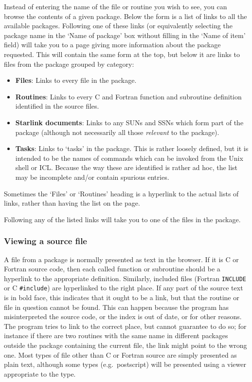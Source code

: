 \documentclass[twoside,11pt]{article}
\renewcommand{\_}{\texttt{\symbol{95}}}
\begin{document}
Instead of entering the name of the file or routine you wish to
see, you can browse the contents of a given package.
Below the form is a list of links to all the available packages.
Following one of these links (or equivalently selecting the package
name in the `Name of package' box without filling in the `Name of item'
field) will take you to a page giving more information about the 
package requested.
This will contain the same form at the top, 
but below it are links to files from the package grouped by category:
\begin{itemize}
\item {\bf Files}:
Links to every file in the package.
\item {\bf Routines}:
Links to every C and Fortran function and subroutine definition 
identified in the source files.
\item {\bf Starlink documents}:
Links to any SUNs and SSNs which form part of the package
(although not necessarily all those {\it relevant\/} to the package).
\item {\bf Tasks}:
Links to `tasks' in the package.
This is rather loosely defined, but it is intended to be
the names of commands which can be invoked from the Unix shell or ICL.
Because the way these are identified is rather ad hoc,
the list may be incomplete and/or contain spurious entries.
\end{itemize}
Sometimes the `Files' or `Routines' heading is a hyperlink to 
the actual lists of links, rather than having the list on the page.

Following any of the listed links 
will take you to one of the files in the package.

\subsubsection{Viewing a source file}

A file from a package is normally presented as text in the browser.
If it is C or Fortran source code, then each called function or
subroutine should be a hyperlink to the appropriate definition.
Similarly, included files (Fortran {\tt INCLUDE} or C {\tt \#include}) 
are hyperlinked to the right place.
If any part of the source text is in bold face,
this indicates that it ought to be a link,
but that the routine or file in question cannot be found. 
This can happen because the program has misinterpreted the source code,
or the index is out of date, or for other reasons.
The program tries to link to the correct place, 
but cannot guarantee to do so; for instance if there are two 
routines with the same name in different packages outside the
package containing the current file, the link might point to
the wrong one.
Most types of file other than C or Fortran source are 
simply presented as plain text, although some types
(e.g.\ postscript)
will be presented using a viewer appropriate to the type.
\end{document}
